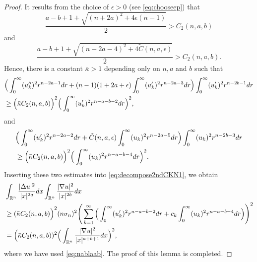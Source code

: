 \documentclass[a4paper,12pt]{article}
\theoremstyle{plain}
\theoremstyle{definition}
\theoremstyle{remark}
\def\R{\mathbb R}%
\def\ep{\epsilon}%
\def\irn{\int_{\R^n}}
\numberwithin{equation}{section}
\begin{document}
\begin{proof}
It results from the choice of $\epsilon >0$ (see \eqref{eq:chooseep}) that 
\[
\frac{a-b+1 + \sqrt{(n+2a)^2 + 4\ep(n-1)}}2 > C_2(n,a,b)
\]
and 
\[
\frac{a-b+1 + \sqrt{(n-2a-4)^2 + 4 \tilde{C}(n,a,\epsilon)}}2 > C_2(n,a,b).
\]
Hence, there is a constant $\bar{\kappa} > 1$ depending only on $n,a$ and $b$ such that
\begin{align*}
&\Big(\int_0^\infty (u_k'')^2 r^{n-2a -1} dr + (n-1)(1+2a+\epsilon)\int_0^\infty (u_k')^2 r^{n-2a -3} dr\Big)\int_0^\infty (u_k')^2 r^{n-2b -1} dr\notag\\
&\geq \Big(\bar{\kappa} C_2(n,a,b)\Big)^2 \Big(\int_0^\infty (u_k')^2 r^{n-a-b -2} dr\Big)^2,
\end{align*}
and
\begin{align*}
&\Big(\int_0^\infty (u_k')^2 r^{n-2a -2} dr +  \tilde{C}(n,a,\epsilon)\int_0^\infty (u_k)^2 r^{n-2a -5} dr\Big)\int_0^\infty (u_k)^2 r^{n-2b -3} dr\notag\\
&\geq \Big(\bar{\kappa} C_2(n,a,b)\Big)^2 \Big(\int_0^\infty (u_k)^2 r^{n-a-b -4} dr\Big)^2.
\end{align*}
Inserting these two estimates into \eqref{eq:decompose2ndCKN1}, we obtain
\begin{align*}
&\irn \frac{|\Delta u|^2}{|x|^{2a}} dx \irn \frac{|\nabla u|^2}{|x|^{2b}} dx\notag\\
&\geq (\bar{\kappa}C_2(n,a,b)\Big)^2 (n\sigma_n)^2 \Bigg(\sum_{k=1}^\infty\Big(\int_0^\infty (u_k')^2 r^{n-a-b -2} dr + c_k \int_0^\infty (u_k)^2 r^{n-a-b -4} dr\Big)\Bigg)^2\notag\\
&=\Big(\bar{\kappa}C_2(n,a,b))^2 \Big(\irn \frac{|\nabla u|^2}{|x|^{a+b+1}} dx\Big)^2,
\end{align*}
where we have used  \eqref{eq:nablaab}. The proof of this lemma is completed.
\end{proof}
\end{document}

